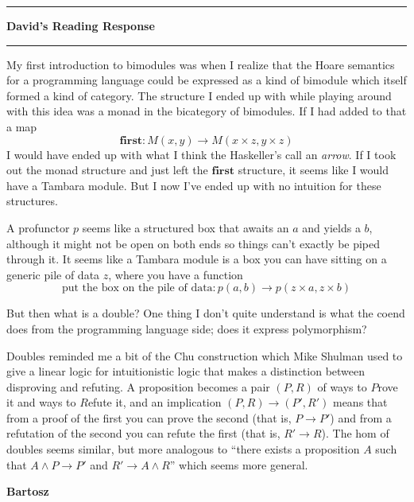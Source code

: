 \documentclass{amsart}
\newcommand{\iam}[1]{
  \vspace{0.25em}
  \hrule
  \vspace{0.25em}
  \textbf{{#1}'s Reading Response}
  \vspace{0.25em}
  \hrule
  \vspace{1em}
}
\newcommand{\respond}[1]{
  \vspace{1em} \textbf{#1}
}
\begin{document}
\iam{David}
My first introduction to bimodules was when I realize that the Hoare semantics for a programming language could be expressed as a kind of bimodule which itself formed a kind of category. The structure I ended up with while playing around with this idea was a monad in the bicategory of bimodules. If I had added to that a map
$$\textbf{first} : M(x, y) \to M(x \times z, y \times z)$$
I would have ended up with what I think the Haskeller's call an \emph{arrow}. If I took out the monad structure and just left the $\textbf{first}$ structure, it seems like I would have a Tambara module. But I now I've ended up with no intuition for these structures.

A profunctor $p$ seems like a structured box that awaits an $a$ and yields a $b$, although it might not be open on both ends so things can't exactly be piped through it. It seems like a Tambara module is a box you can have sitting on a generic pile of data $z$, where you have a function
$$\mbox{put the box on the pile of data} : p(a, b) \to p(z \times a, z \times b)$$

But then what is a double? One thing I don't quite understand is what the coend does from the programming language side; does it express polymorphism?

Doubles reminded me a bit of the Chu construction which Mike Shulman used to give a linear logic for intuitionistic logic that makes a distinction between disproving and refuting. A proposition becomes a pair $(P, R)$ of ways to $P$rove it and ways to $R$efute it, and an implication $(P, R) \to (P', R')$ means that from a proof of the first you can prove the second (that is, $P \to P'$) and from a refutation of the second you can refute the first (that is, $R' \to R$). The hom of doubles seems similar, but more analogous to ``there exists a proposition $A$ such that $A \wedge P \to P'$ and $R' \to A \wedge R$'' which seems more general.

\respond{Bartosz}
\end{document}
